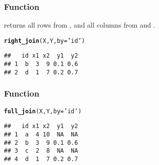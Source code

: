 \documentclass[12pt]{beamer}\usepackage[]{graphicx}\usepackage[]{color}
\makeatletter
\newcommand{\hlstr}[1]{\textcolor[rgb]{0.192,0.494,0.8}{#1}}%
\newcommand{\hlstd}[1]{\textcolor[rgb]{0.345,0.345,0.345}{#1}}%
\newcommand{\hlkwc}[1]{\textcolor[rgb]{0.333,0.667,0.333}{#1}}%
\newcommand{\hlkwd}[1]{\textcolor[rgb]{0.737,0.353,0.396}{\textbf{#1}}}%
\newenvironment{kframe}{%
 \def\at@end@of@kframe{}%
 \ifinner\ifhmode%
  \def\at@end@of@kframe{\end{minipage}}%
  \begin{minipage}{\columnwidth}%
 \fi\fi%
 \def\FrameCommand##1{\hskip\@totalleftmargin \hskip-\fboxsep
 \colorbox{shadecolor}{##1}\hskip-\fboxsep
     \hskip-\linewidth \hskip-\@totalleftmargin \hskip\columnwidth}%
 \MakeFramed {\advance\hsize-\width
   \@totalleftmargin\z@ \linewidth\hsize
   \@setminipage}}%
 {\par\unskip\endMakeFramed%
 \at@end@of@kframe}
\newenvironment{knitrout}{}{} %
\makeatother
\begin{document}
\begin{frame}[fragile]
\frametitle{Function }

 returns all rows from , and all columns from  and .
\begin{knitrout}\footnotesize
{}\color{fgcolor}\begin{kframe}
\begin{alltt}
\hlkwd{right_join}\hlstd{(X, Y,} \hlkwc{by} \hlstd{=} \hlstr{'id'}\hlstd{)}
\end{alltt}
\begin{verbatim}
##   id x1 x2  y1  y2
## 1  b  3  9 0.1 0.6
## 2  d  1  7 0.2 0.7
\end{verbatim}
\end{kframe}
\end{knitrout}

\end{frame}


\begin{frame}[fragile]
\frametitle{Function }

\begin{knitrout}\footnotesize
{}\color{fgcolor}\begin{kframe}
\begin{alltt}
\hlkwd{full_join}\hlstd{(X, Y,} \hlkwc{by} \hlstd{=} \hlstr{'id'}\hlstd{)}
\end{alltt}
\begin{verbatim}
##   id x1 x2  y1  y2
## 1  a  4 10  NA  NA
## 2  b  3  9 0.1 0.6
## 3  c  2  8  NA  NA
## 4  d  1  7 0.2 0.7
\end{verbatim}
\end{kframe}
\end{knitrout}

\end{frame}


\begin{frame}[fragile]
\frametitle{}
\begin{center}
\end{center}
\end{frame}

\end{document}
